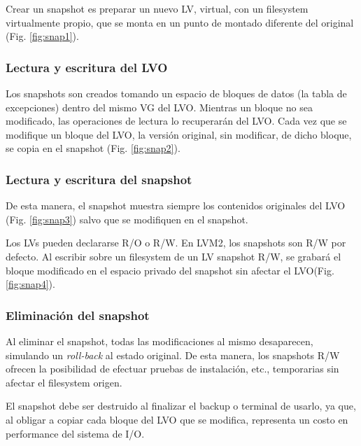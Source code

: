 Crear un snapshot es preparar un nuevo LV, virtual, con un filesystem virtualmente propio, que se monta en un punto de montado diferente del original (Fig. \ref{fig:snap1}). 

 
\subsubsection{Lectura y escritura del LVO}
\label{ssub:lvorw}
Los snapshots son creados tomando un espacio de bloques de datos (la tabla de excepciones) dentro del mismo VG del LVO. Mientras un bloque no sea modificado, las operaciones de lectura lo recuperarán del LVO. Cada vez que se modifique un bloque del LVO, la versión original, sin modificar, de dicho bloque, se copia en el snapshot (Fig. \ref{fig:snap2}). 

 
\subsubsection{Lectura y escritura del snapshot}
\label{ssub:snaprw}
De esta manera, el snapshot muestra siempre los contenidos originales del LVO (Fig. \ref{fig:snap3}) salvo que se modifiquen en el snapshot.


Los LVs pueden declararse R/O o R/W. En LVM2, los snapshots son R/W por defecto.  Al escribir sobre un filesystem de un LV snapshot R/W, se grabará el bloque modificado en el espacio privado del snapshot sin afectar el LVO(Fig. \ref{fig:snap4}). 


\subsubsection{Eliminación del snapshot}
\label{ssub:snapdel}
Al eliminar el snapshot, todas las modificaciones al mismo desaparecen, simulando un \emph{roll-back} al estado original. De esta manera, los snapshots R/W ofrecen la posibilidad de efectuar pruebas de instalación, etc., temporarias sin afectar el filesystem origen. 

El snapshot debe ser destruido al finalizar el backup o terminal de usarlo, ya que, al obligar a  copiar  cada bloque del LVO que se modifica, representa un  costo en performance del sistema de I/O.

